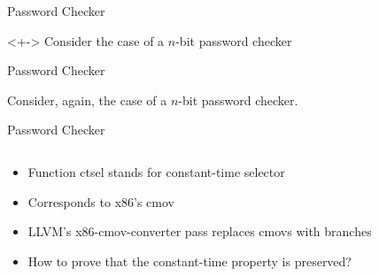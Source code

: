 
\begin{frame}{Password Checker}
\begin{example}<+->
    Consider the case of a $n$-bit password checker
    \only<+->{}
\end{example}
\end{frame}

\begin{frame}{Password Checker}
\begin{example}
    Consider, again, the case of a $n$-bit password checker.
\end{example}
\end{frame}

\begin{frame}{Password Checker}
\inputminted{idris}{include/code/check-safe.idr}
\begin{itemize}
    \item<2-| alert@2> Function ctsel stands for
        constant-time selector
        
    \item<3-| alert@3> Corresponds to x86's cmov
    
    \item<4-| alert@4> LLVM's x86-cmov-converter pass
        replaces cmovs with branches
        
    \item<5-| alert@5> How to prove that the constant-time property
        is preserved?
\end{itemize}
\end{frame}